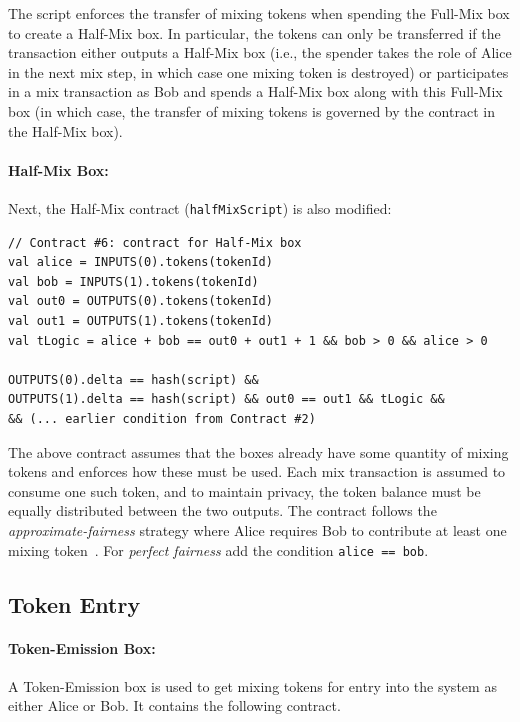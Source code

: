 \documentclass[runningheads]{llncs}
\begin{document}
The script enforces the transfer of mixing tokens when spending the Full-Mix box to create a Half-Mix box. In particular, the tokens can only be transferred if the transaction either outputs a Half-Mix box (i.e., the spender takes the role of Alice in the next mix step, in which case one mixing token is destroyed) or participates in a mix transaction as Bob and spends a Half-Mix box along with this Full-Mix box (in which case, the transfer of mixing tokens is governed by the contract in the Half-Mix box).

\paragraph{Half-Mix Box:}
Next, the Half-Mix contract (\texttt{halfMixScript}) is also modified:
{\small
\begin{Verbatim}[frame=single]
// Contract #6: contract for Half-Mix box
val alice = INPUTS(0).tokens(tokenId)
val bob = INPUTS(1).tokens(tokenId)
val out0 = OUTPUTS(0).tokens(tokenId)
val out1 = OUTPUTS(1).tokens(tokenId)
val tLogic = alice + bob == out0 + out1 + 1 && bob > 0 && alice > 0 
  
OUTPUTS(0).delta == hash(script) && 
OUTPUTS(1).delta == hash(script) && out0 == out1 && tLogic &&
&& (... earlier condition from Contract #2)
\end{Verbatim}
}

The above contract assumes that the boxes already have some quantity of mixing tokens and enforces how these must be used. Each mix transaction is assumed to consume one such token, and to maintain privacy, the token balance must be equally distributed between the two outputs. The contract follows the {\em approximate-fairness} strategy where Alice requires Bob to contribute at least one mixing token~\cite{advtutorial}. For {\em perfect fairness} add the condition \texttt{alice == bob}. 

\subsection{Token Entry}

\paragraph{Token-Emission Box:} A Token-Emission box is used to get mixing tokens for entry into the system as either Alice or Bob. It contains the following contract. 
\end{document}
